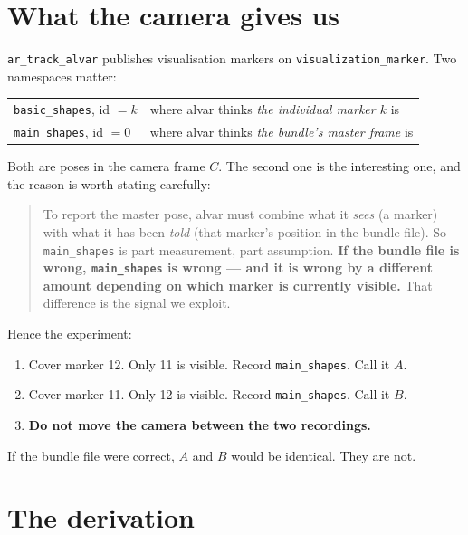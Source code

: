 \documentclass[11pt,a4paper]{article}
\begin{document}
\section{What the camera gives us}

\texttt{ar\_track\_alvar} publishes visualisation markers on
\texttt{visualization\_marker}. Two namespaces matter:

\begin{center}
\begin{tabular}{ll}
\toprule
\texttt{basic\_shapes}, id $=k$ & where alvar thinks \emph{the individual marker $k$} is \\
\texttt{main\_shapes}, id $=0$  & where alvar thinks \emph{the bundle's master frame} is \\
\bottomrule
\end{tabular}
\end{center}

Both are poses in the camera frame $C$. The second one is the interesting one, and the
reason is worth stating carefully:

\begin{quote}
To report the master pose, alvar must combine what it \emph{sees} (a marker) with what it
has been \emph{told} (that marker's position in the bundle file). So
\texttt{main\_shapes} is part measurement, part assumption. \textbf{If the bundle file is
wrong, \texttt{main\_shapes} is wrong --- and it is wrong by a different amount depending
on which marker is currently visible.} That difference is the signal we exploit.
\end{quote}

Hence the experiment:

\begin{enumerate}[leftmargin=*,itemsep=1pt]
\item Cover marker 12. Only 11 is visible. Record \texttt{main\_shapes}. Call it $A$.
\item Cover marker 11. Only 12 is visible. Record \texttt{main\_shapes}. Call it $B$.
\item \textbf{Do not move the camera between the two recordings.}
\end{enumerate}

If the bundle file were correct, $A$ and $B$ would be identical. They are not.

\section{The derivation}
\label{sec:derivation}
\end{document}

